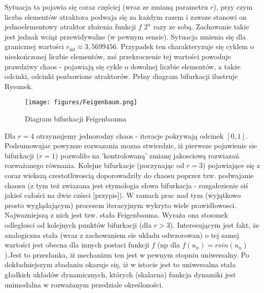 \documentclass[12pt]{article}
\begin{document}
Sytuacja ta pojawia się coraz częściej (wraz ze zmianą parametru $ r $), przy czym liczba elementów atraktora podwaja się za każdym razem i zawsze stanowi on jednoelementowy atraktor złożenia funkcji $ f $ $ 2^{n} $ razy ze sobą. \newline
Zachowanie takie jest jednak wciąż przewidywalne (w pewnym sensie). Sytuacja zmienia się dla granicznej wartości \cite{Tempczyk} $ r_{\inf} \approx 3,5699456 $. Przypadek ten charakteryzuje się cyklem o nieskończonej liczbie elementów, zaś przekroczenie tej wartości powoduje prawdziwy chaos - pojawiają się cykle o dowolnej liczbie elementów, a także odcinki, odcinki pozbawione atraktorów. Pełny diagram bifurkacji ilustruje Rysunek.
\begin{figure}[H]
	\texttt{[image: figures/Feigenbaum.png]} 
	\centering
	\caption{Diagram bifurkacji Feigenbauma}
\end{figure}
Dla $ r=4 $ otrzymujemy jednorodny chaos - iteracje pokrywają odcinek $ [0,1] $.\newline
Podsumowujac powyzsze rozwazania mozna stwierdzic, iż pierwsze pojawienie sie bifurkacji ($ r = 1$) pozwoliło na 'kontrolowaną' zmianę jakosciową rozwiazań rozważanego równania. Kolejne bifurkacje (poczynając od $ r = 3$) pojawiające się z coraz wiekszą czestotliwoscią doporowadziły do chaosu poprzez tzw. podwajanie chaosu (z tym też zwiazana jest etymologia słowa bifurkacja - rozgałezienie siś jakieś całości na dwie czśsci [przypis]). W ramach prac nad tym (wyjątkowo prosto wyglądającym) procesem iteracyjnym wykryto wiele prawidłowosci. Najwazniejszą z nich jest tzw. stała Feigenbauma. Wyraża ona stosunek odległosci od kolejnych punktów bifurkacji (dla $r>3$). Interesującym jest fakt, że analogiczna stała (wraz z zachowaniem sie ukladu odwzorowan) o tej samej wartości jest obecna dla innych postaci funkcji $f$ (np dla $ f(u_{n}) = rsin(u_{n})$).Jest to przesłanka, iż mechanizm ten jest w pewnym stopniu uniwersalny. Po dokładniejszym zbadaniu okazuje się, iż w istocie jest to uniwersalna stała gładkich układów dynamicznych, których (skalarna) funkcja dynamiki jest unimodalna w rozważanym przedziale określoności.
\end{document}

